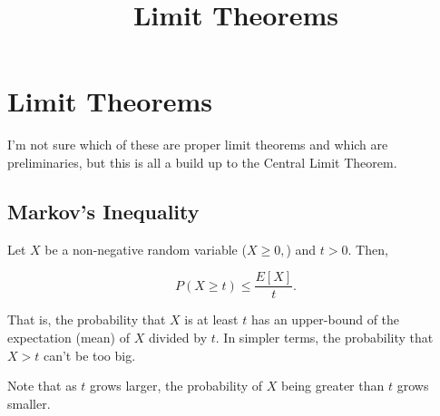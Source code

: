 \documentclass{article}
\title{Limit Theorems}
\begin{document}
\section{Limit Theorems}

I'm not sure which of these are proper limit theorems and which are preliminaries, but this is all a build up to the \@{Central Limit Theorem}.

\subsection{Markov's Inequality}

\begin{theorem}\label{markovs-inequality}
Let $X$ be a \@{non-negative} \@{random variable} ($X \geq 0,$) and $t > 0.$ Then,

\[ P(X \geq t) \leq \frac{E[X]}{t}. \]
\end{theorem}

\begin{note}
That is, the \@{probability} that $X$ is at least $t$ has an upper-bound of the \@{expectation} (mean) of $X$ divided by $t.$ In simpler terms, the probability that $X > t$ can't be too big.

Note that as $t$ grows larger, the probability of $X$ being greater than $t$ grows smaller.
\end{note}
\end{document}
